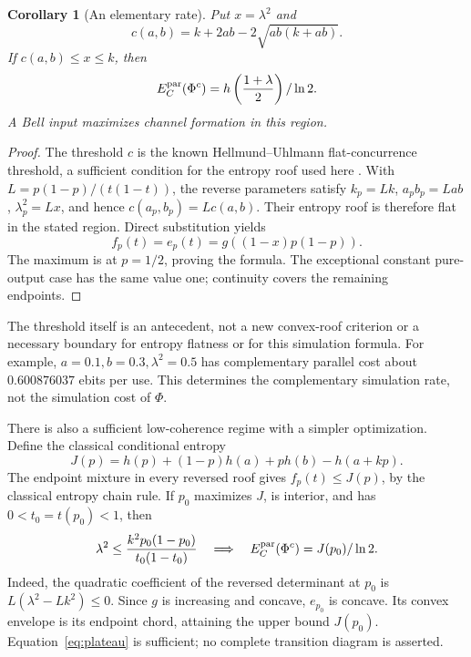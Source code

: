 \documentclass[11pt]{article}
\newtheorem{corollary}[theorem]{Corollary}
\begin{document}
\begin{corollary}[An elementary rate]\label{cor:closedcost}
Put $x=\lambda^2$ and
\[
 c(a,b)=k+2ab-2\sqrt{ab(k+ab)}.
\]
If $c(a,b)\le x\le k$, then
\[
 E_C^{\rm par}(\Phi^c)=h\left(\frac{1+\lambda}{2}\right)/\ln2.
\]
A Bell input maximizes channel formation in this region.
\end{corollary}
\begin{proof}
The threshold $c$ is the known Hellmund--Uhlmann flat-concurrence threshold,
a sufficient condition for the entropy roof used here
\cite[Equation (29) and Section V.B]{hu}. With $L=p(1-p)/(t(1-t))$, the reverse parameters
satisfy $k_p=Lk$, $a_pb_p=Lab$, $\lambda_p^2=Lx$, and hence
$c(a_p,b_p)=Lc(a,b)$. Their entropy roof is therefore flat in the stated
region. Direct substitution yields
\[
 f_p(t)=e_p(t)=g((1-x)p(1-p)).
\]
The maximum is at $p=1/2$, proving the formula. The exceptional constant
pure-output case has the same value one; continuity covers the remaining
endpoints.
\end{proof}
The threshold itself is an antecedent, not a new convex-roof criterion or
a necessary boundary for entropy flatness or for this simulation formula.
For example, $a=0.1,b=0.3,\lambda^2=0.5$ has complementary parallel cost
about $0.600876037$ ebits per use. This determines the complementary
simulation rate, not the simulation cost of $\Phi$.

There is also a sufficient low-coherence regime with a simpler optimization.
Define the classical conditional entropy
\[
 J(p)=h(p)+(1-p)h(a)+p h(b)-h(a+kp).
\]
The endpoint mixture in every reversed roof gives $f_p(t)\le J(p)$, by the
classical entropy chain rule. If $p_0$ maximizes $J$, is interior, and has
$0<t_0=t(p_0)<1$, then
\begin{equation}\label{eq:plateau}
 \lambda^2\le\frac{k^2p_0(1-p_0)}{t_0(1-t_0)}
 \quad\Longrightarrow\quad
 E_C^{\rm par}(\Phi^c)=J(p_0)/\ln2.
\end{equation}
Indeed, the quadratic coefficient of the reversed determinant at $p_0$ is
$L(\lambda^2-Lk^2)\le0$. Since $g$ is increasing and concave, $e_{p_0}$ is
concave. Its convex envelope is its endpoint chord, attaining the upper
bound $J(p_0)$. Equation~\eqref{eq:plateau} is sufficient; no complete
transition diagram is asserted.
\end{document}
